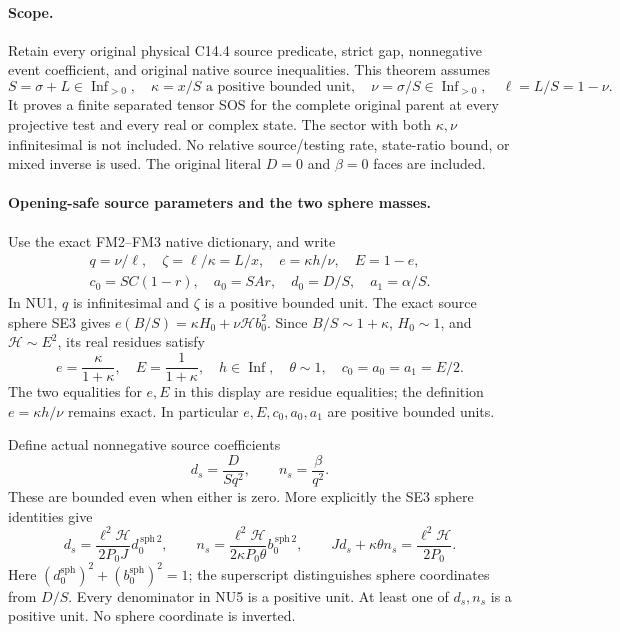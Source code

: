 \label{component:p578719565e9d}

\label{p578719565e9d:sec:new-c144-nu-endpoint}

\paragraph{Scope.}
Retain every original physical C14.4 source predicate, strict gap,
nonnegative event coefficient, and original native source inequalities.
This theorem assumes
\[
 S=\sigma+L\in\operatorname{Inf}_{>0},\quad
 \kappa=x/S\text{ a positive bounded unit},\quad
 \nu=\sigma/S\in\operatorname{Inf}_{>0},\quad\ell=L/S=1-\nu.
 \tag{NU1}
\]
It proves a finite separated tensor SOS for the complete original
parent at every projective test and every real or complex state.
The sector with both $\kappa,\nu$ infinitesimal is not included.
No relative source/testing rate, state-ratio bound, or mixed inverse
is used. The original literal $D=0$ and $\beta=0$ faces are included.

\paragraph{Opening-safe source parameters and the two sphere masses.}
Use the exact FM2--FM3 native dictionary, and write
\[
\begin{gathered}
 q=\nu/\ell,\quad \zeta=\ell/\kappa=L/x,\quad
 e=\kappa h/\nu,\quad E=1-e,\\
 c_0=SC(1-r),\quad a_0=SAr,\quad d_0=D/S,\quad a_1=\alpha/S.
\end{gathered}
 \tag{NU2}
\]
In NU1, $q$ is infinitesimal and $\zeta$ is a positive bounded
unit. The exact source sphere SE3 gives
$e(B/S)=\kappa H_0+\nu\mathcal H b_0^2$.
Since $B/S\sim1+\kappa$, $H_0\sim1$, and
$\mathcal H\sim E^2$, its real residues satisfy
\[
 e=\frac\kappa{1+\kappa},\quad E=\frac1{1+\kappa},\quad
 h\in\operatorname{Inf},\quad\theta\sim1,\quad
 c_0=a_0=a_1=E/2.
 \tag{NU3}
\]
The two equalities for $e,E$ in this display are residue
equalities; the definition $e=\kappa h/\nu$ remains exact.
In particular $e,E,c_0,a_0,a_1$ are positive bounded units.

Define actual nonnegative source coefficients
\[
 d_s=\frac{D}{Sq^2},\qquad n_s=\frac\beta{q^2}.
 \tag{NU4}
\]
These are bounded even when either is zero. More explicitly the
SE3 sphere identities give
\[
 d_s=\frac{\ell^2\mathcal H}{2P_0J}d_0^{\,\mathrm{sph}\,2},
 \qquad
 n_s=\frac{\ell^2\mathcal H}{2\kappa P_0\theta}
                                   b_0^{\,\mathrm{sph}\,2},
 \qquad
 Jd_s+\kappa\theta n_s=\frac{\ell^2\mathcal H}{2P_0}.
 \tag{NU5}
\]
Here $(d_0^{\mathrm{sph}})^2+(b_0^{\mathrm{sph}})^2=1$;
the superscript distinguishes sphere coordinates from $D/S$.
Every denominator in NU5 is a positive unit. At least one of
$d_s,n_s$ is a positive unit. No sphere coordinate is inverted.

